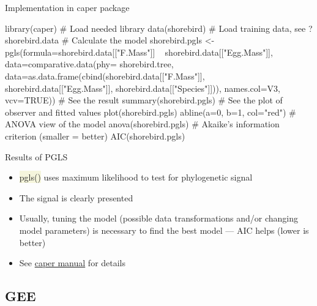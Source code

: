 \documentclass[compress, xelatex, 11pt, xcolor=svgnames, aspectratio=169,
	hyperref={
		bookmarks=true,
		unicode=true,
		colorlinks=true,
		pdftitle={Molecular data in R},
		plainpages=false,
		pdfauthor={Vojtech Zeisek},
		pdfsubject={Course about phylogeny and evolution in R},
		pdfcreator={XeLaTeX},
		pdfkeywords={R, evolution, phylogeny, molecular data},
		linkcolor=Crimson, %
		anchorcolor=Magenta, %
		citecolor=Magenta, %
		filecolor=Magenta, %
		menucolor=Magenta, %
		urlcolor=DodgerBlue, %
		},
	url={hyphens, lowtilde} %
	]{beamer}
\renewcommand{\texttt}[1]{\colorbox{Beige}{{\ttfamily #1}}}
\begin{document}
\begin{frame}[fragile]{Implementation in caper package}
	\begin{spluscode}
    library(caper) # Load needed library
    data(shorebird) # Load training data, see ?shorebird.data
    # Calculate the model
    shorebird.pgls <- pgls(formula=shorebird.data[["F.Mass"]] ~
      shorebird.data[["Egg.Mass"]], data=comparative.data(phy=
      shorebird.tree, data=as.data.frame(cbind(shorebird.data[["F.Mass"]],
      shorebird.data[["Egg.Mass"]], shorebird.data[["Species"]])),
      names.col=V3, vcv=TRUE))
    # See the result
    summary(shorebird.pgls)
    # See the plot of observer and fitted values
    plot(shorebird.pgls)
    abline(a=0, b=1, col="red")
    # ANOVA view of the model
    anova(shorebird.pgls)
    # Akaike's information criterion (smaller = better)
    AIC(shorebird.pgls)
	\end{spluscode}
\end{frame}

\begin{frame}{Results of PGLS}
	\begin{multicols}{2}
		\begin{center}
			\texttt{[image: shorebirds.png]}
		\end{center}
		\begin{itemize}
			\item \texttt{pgls()} uses maximum likelihood to test for phylogenetic signal
			\item The signal is clearly presented
			\item Usually, tuning the model (possible data transformations and/or changing model parameters) is necessary to find the best model --- AIC helps (lower is better)
			\item See \href{https://CRAN.R-project.org/package=caper}{caper manual} for details
		\end{itemize}
	\end{multicols}
\end{frame}

\subsection{GEE}
\end{document}
